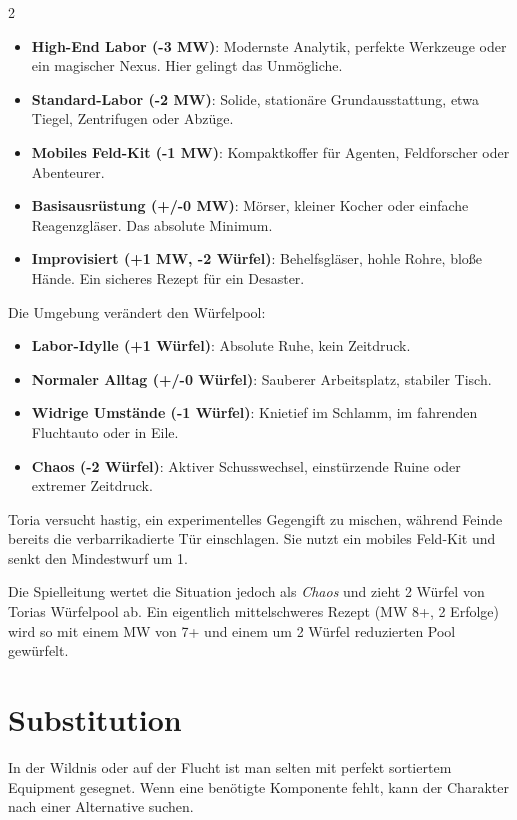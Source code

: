 \begin{multicols}{2}
\begin{itemize}
    \item \textbf{High-End Labor (-3 MW)}: Modernste Analytik, perfekte Werkzeuge oder ein magischer Nexus. Hier gelingt das Unmögliche.
    \item \textbf{Standard-Labor (-2 MW)}: Solide, stationäre Grundausstattung, etwa Tiegel, Zentrifugen oder Abzüge.
    \item \textbf{Mobiles Feld-Kit (-1 MW)}: Kompaktkoffer für Agenten, Feldforscher oder Abenteurer.
    \item \textbf{Basisausrüstung (+/-0 MW)}: Mörser, kleiner Kocher oder einfache Reagenzgläser. Das absolute Minimum.
    \item \textbf{Improvisiert (+1 MW, -2 Würfel)}: Behelfsgläser, hohle Rohre, bloße Hände. Ein sicheres Rezept für ein Desaster.
\end{itemize}

Die Umgebung verändert den Würfelpool:
\begin{itemize}
    \item \textbf{Labor-Idylle (+1 Würfel)}: Absolute Ruhe, kein Zeitdruck.
    \item \textbf{Normaler Alltag (+/-0 Würfel)}: Sauberer Arbeitsplatz, stabiler Tisch.
    \item \textbf{Widrige Umstände (-1 Würfel)}: Knietief im Schlamm, im fahrenden Fluchtauto oder in Eile.
    \item \textbf{Chaos (-2 Würfel)}: Aktiver Schusswechsel, einstürzende Ruine oder extremer Zeitdruck.
\end{itemize}

\begin{pexample}[Beispiel]
Toria versucht hastig, ein experimentelles Gegengift zu mischen, während Feinde bereits die verbarrikadierte Tür einschlagen. Sie nutzt ein mobiles Feld-Kit und senkt den Mindestwurf um 1.

Die Spielleitung wertet die Situation jedoch als \textit{Chaos} und zieht 2 Würfel von Torias Würfelpool ab. Ein eigentlich mittelschweres Rezept (MW 8+, 2 Erfolge) wird so mit einem MW von 7+ und einem um 2 Würfel reduzierten Pool gewürfelt.
\end{pexample}

\section{Substitution}

In der Wildnis oder auf der Flucht ist man selten mit perfekt sortiertem Equipment gesegnet. Wenn eine benötigte Komponente fehlt, kann der Charakter nach einer Alternative suchen.


\end{multicols}
